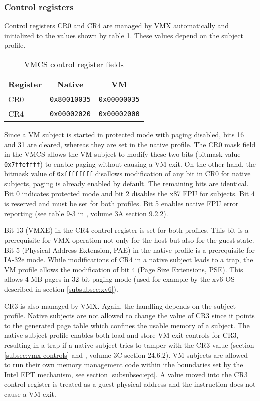 \subsubsection{Control registers}\label{subsubsec:control-regs}
Control registers CR0 and CR4 are managed by VMX automatically and initialized
to the values shown by table \ref{tab:vmcs-control-regs}. These values depend
on the subject profile.

\begin{table}[h]
	\centering
	\begin{tabular}{l|c|c}
		\textbf{Register} & \textbf{Native} & \textbf{VM} \\
		\hline
		CR0 & \texttt{0x80010035} & \texttt{0x00000035} \\
		CR4 & \texttt{0x00002020} & \texttt{0x00002000} \\
		\hline
	\end{tabular}
	\caption{VMCS control register fields}
	\label{tab:vmcs-control-regs}
\end{table}

Since a VM subject is started in protected mode with paging disabled, bits 16
and 31 are cleared, whereas they are set in the native profile. The CR0 mask
field in the VMCS allows the VM subject to modify these two bits (bitmask value
\texttt{0x7ffeffff}) to enable paging without causing a VM exit. On the other
hand, the bitmask value of \texttt{0xffffffff} disallows modification of any bit
in CR0 for native subjects, paging is already enabled by default. The remaining
bits are identical. Bit 0 indicates protected mode and bit 2 disables the x87
FPU for subjects. Bit 4 is reserved and must be set for both profiles. Bit 5
enables native FPU error reporting (see table 9-3 in \cite{IntelSDM}, volume 3A
section 9.2.2).

Bit 13 (VMXE) in the CR4 control register is set for both profiles. This bit is
a prerequisite for VMX operation not only for the host but also for the
guest-state. Bit 5 (Physical Address Extension, PAE) in the native
profile is a prerequisite for IA-32e mode. While modifications of CR4 in a
native subject leads to a trap, the VM profile allows the modification of bit 4
(Page Size Extensions, PSE). This allows 4 MB pages in 32-bit paging
mode (used for example by the xv6 OS described in section \ref{subsubsec:xv6}).

CR3 is also managed by VMX. Again, the handling depends on the subject profile.
Native subjects are not allowed to change the value of CR3 since it points to
the generated page table which confines the usable memory of a subject. The
native subject profile enables both load and store VM exit controls for CR3,
resulting in a trap if a native subject tries to tamper with the CR3 value
(section \ref{subsec:vmx-controls} and \cite{IntelSDM}, volume 3C section
24.6.2). VM subjects are allowed to run their own memory management code within
ithe boundaries set by the Intel EPT mechanism, see section \ref{subsubsec:ept}.
A value moved into the CR3 control register is treated as a guest-physical address
and the instruction does not cause a VM exit.

